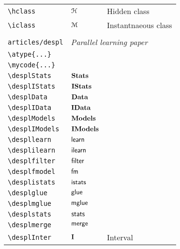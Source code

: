 \begin{longtable}{lll}
 {\color[rgb]{0.5,0.5,0.5}\texttt{\textbackslash hclass}} & $\mathcal{H}$ &  Hidden class\\ 
 {\color[rgb]{0.5,0.5,0.5}\texttt{\textbackslash iclass}} & $\mathcal{M}$ &  Instantnaeous class\\ 
  &  & \\ 
 {\color[rgb]{0.5,0.5,0.5}\texttt{articles/despl}} & \multicolumn{2}{l}{\emph{Parallel learning paper}}\\ 
 \hline
{\color[rgb]{0.5,0.5,0.5}\texttt{\textbackslash atype\{...\}}} &  & \\ 
 {\color[rgb]{0.5,0.5,0.5}\texttt{\textbackslash mycode\{...\}}} &  & \\ 
 {\color[rgb]{0.5,0.5,0.5}\texttt{\textbackslash desplStats}} & $\mathsf{\bf Stats }$ & \\ 
 {\color[rgb]{0.5,0.5,0.5}\texttt{\textbackslash desplIStats}} & $\mathsf{\bf IStats }$ & \\ 
 {\color[rgb]{0.5,0.5,0.5}\texttt{\textbackslash desplData}} & $\mathsf{\bf Data }$ & \\ 
 {\color[rgb]{0.5,0.5,0.5}\texttt{\textbackslash desplIData}} & $\mathsf{\bf IData }$ & \\ 
 {\color[rgb]{0.5,0.5,0.5}\texttt{\textbackslash desplModels}} & $\mathsf{\bf Models }$ & \\ 
 {\color[rgb]{0.5,0.5,0.5}\texttt{\textbackslash desplIModels}} & $\mathsf{\bf IModels }$ & \\ 
 {\color[rgb]{0.5,0.5,0.5}\texttt{\textbackslash despllearn}} & $\mathsf{learn}$ & \\ 
 {\color[rgb]{0.5,0.5,0.5}\texttt{\textbackslash desplilearn}} & $\mathsf{ilearn}$ & \\ 
 {\color[rgb]{0.5,0.5,0.5}\texttt{\textbackslash desplfilter}} & $\mathsf{filter}$ & \\ 
 {\color[rgb]{0.5,0.5,0.5}\texttt{\textbackslash desplfmodel}} & $\mathsf{fm}$ & \\ 
 {\color[rgb]{0.5,0.5,0.5}\texttt{\textbackslash desplistats}} & $\mathsf{istats}$ & \\ 
 {\color[rgb]{0.5,0.5,0.5}\texttt{\textbackslash desplglue}} & $\mathsf{glue}$ & \\ 
 {\color[rgb]{0.5,0.5,0.5}\texttt{\textbackslash desplmglue}} & $\mathsf{mglue}$ & \\ 
 {\color[rgb]{0.5,0.5,0.5}\texttt{\textbackslash desplstats}} & $\mathsf{stats}$ & \\ 
 {\color[rgb]{0.5,0.5,0.5}\texttt{\textbackslash desplmerge}} & $\mathsf{merge}$ & \\ 
 {\color[rgb]{0.5,0.5,0.5}\texttt{\textbackslash desplInter}} & $\mathsf{\bf I }$ &  Interval\\ 

\end{longtable}
